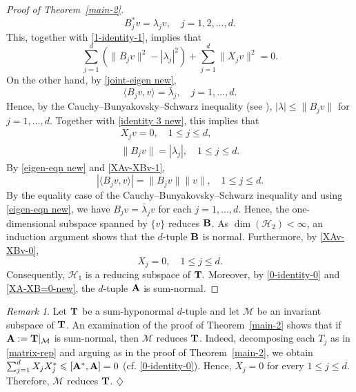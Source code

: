 \documentclass[10pt, a4paper, oneside, reqno]{amsproc}
\numberwithin{equation}{section}
\theoremstyle{remark}
\newtheorem{remark}[theorem]{Remark}
\theoremstyle{definition}
\newcommand*{\Le}{\leqslant}
\begin{document}
\begin{proof}[Proof of Theorem~\ref{main-2}]
\begin{equation}
B_j^*v = \lambda_j v, \quad j=1,2,\ldots, d.
\end{equation}
This, together with \eqref{1-identity-1}, implies that
\begin{equation} \label{identity 3 new}
\sum_{j=1}^d(\|B_j v\|^2-|\lambda_j|^2) 
+ \sum_{j=1}^d \|X_j v\|^2 = 0. 
\end{equation}
On the other hand,  by \eqref{joint-eigen new}, 
\begin{equation} \label{eigen-eqn new}
\langle B_jv, v\rangle = \bar{\lambda}_j, \quad j=1,\ldots,d.
\end{equation}  
Hence, by the Cauchy--Bunyakovsky--Schwarz inequality (see \cite[Theorem~I.1.4]{Co1990}), 
$|\lambda| \Le \|B_jv\|$ for $j=1,\ldots,d.$
Together with \eqref{identity 3 new}, this implies that
\begin{align} \label{XAv-XBv-0}
X_j v = 0, \quad 1 \Le j \Le d, \\ \label{XAv-XBv-1}
\|B_j v\| = |\lambda_j|, \quad 1 \Le j \Le d.
\end{align} 
By \eqref{eigen-eqn new} and \eqref{XAv-XBv-1}, $$|\langle B_jv, v\rangle|=\|B_j v\|\|v\|, \quad 1\Le j \Le d.$$  
By the equality case of the Cauchy--Bunyakovsky--Schwarz inequality and using \eqref{eigen-eqn new}, we have $B_jv=\bar{\lambda}_jv $ for each $j=1,\ldots,d.$ Hence, the one-dimensional subspace spanned by $\{v\}$ reduces ${\bf B}$. 
As $\dim(\mathcal H_2) < \infty$, an induction argument shows that  the $d$-tuple ${\bf B}$ is normal. Furthermore, 
by \eqref{XAv-XBv-0}, 
\begin{equation} \label{XA-XB=0-new}
X_j = 0, \quad 1 \Le j \Le d.
\end{equation}
Consequently, $\mathcal H_1$ is a reducing subspace of ${\bf T}.$ Moreover, by \eqref{0-identity-0} and \eqref{XA-XB=0-new}, the $d$-tuple ${\bf A}$ is sum-normal.
\end{proof}
\begin{remark} \label{restriction-reducing}
Let ${\bf T}$ be a sum-hyponormal $d$-tuple and let $\mathcal M$ be an invariant subspace of ${\bf T}$. An examination of the proof of Theorem~\ref{main-2} shows that if ${\bf A}:={\bf T}|_\mathcal M$ is sum-normal, then $\mathcal M$ reduces ${\bf T}$. 
Indeed, decomposing each $T_j$ as in \eqref{matrix-rep} and arguing as in the proof of Theorem~\ref{main-2}, we obtain $\sum_{j=1}^d  X_jX^*_j \Le [{\bf A^*}, {\bf A}]=0$ (cf. \eqref{0-identity-0}). 
Hence, $X_j =0$ for every $1 \Le j \Le d$. Therefore, $\mathcal M$ reduces ${\bf T}$. \hfill $\diamondsuit$
\end{remark}
\end{document}
